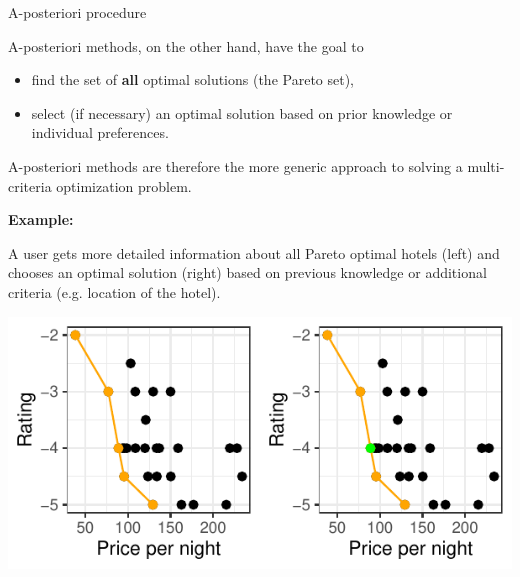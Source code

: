 \begin{frame}[allowframebreaks]{A-posteriori procedure}

A-posteriori methods, on the other hand, have the goal to

\begin{itemize}
\item find the set of \textbf{all} optimal solutions (the Pareto set),
\item select (if necessary) an optimal solution based on prior knowledge or individual preferences.
\end{itemize}

A-posteriori methods are therefore the more generic approach to solving a multi-criteria optimization problem.


\framebreak

\textbf{Example:}

A user gets more detailed information about all Pareto optimal hotels (left) and chooses an optimal solution (right) based on previous knowledge or additional criteria (e.g. location of the hotel).

\vspace*{0.3cm}


\centering \includegraphics[width=0.8\linewidth,height=0.5\textheight]{images/expedia-11-1}


\end{frame}


